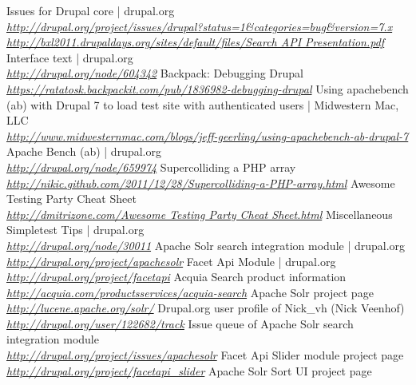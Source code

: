 \begin{thebibliography}{99}
		Issues for Drupal core | drupal.org\\
		\emph{\url{http://drupal.org/project/issues/drupal?status=1&categories=bug&version=7.x}}
		\emph{\url{http://bxl2011.drupaldays.org/sites/default/files/Search API Presentation.pdf}}
		Interface text | drupal.org\\
		\emph{\url{http://drupal.org/node/604342}}
		Backpack: Debugging Drupal\\
		\emph{\url{https://ratatosk.backpackit.com/pub/1836982-debugging-drupal}}
		Using apachebench (ab) with Drupal 7 to load test site with authenticated users | Midwestern Mac, LLC \\
		\emph{\url{http://www.midwesternmac.com/blogs/jeff-geerling/using-apachebench-ab-drupal-7}}
		Apache Bench (ab) | drupal.org\\
		\emph{\url{http://drupal.org/node/659974}}
		Supercolliding a PHP array\\
		\emph{\url{http://nikic.github.com/2011/12/28/Supercolliding-a-PHP-array.html}}
		Awesome Testing Party Cheat Sheet\\
		\emph{\url{http://dmitrizone.com/Awesome Testing Party Cheat Sheet.html}}
		Miscellaneous Simpletest Tips | drupal.org\\
		\emph{\url{http://drupal.org/node/30011}}
		Apache Solr search integration module | drupal.org\\
		\emph{\url{http://drupal.org/project/apachesolr}}
		Facet Api Module |  drupal.org\\
		\emph{\url{http://drupal.org/project/facetapi}}
		Acquia Search product information\\
		\emph{\url{http://acquia.com/productsservices/acquia-search}}
		Apache Solr project page\\
		\emph{\url{http://lucene.apache.org/solr/}}
		Drupal.org user profile of Nick\_vh (Nick Veenhof)\\
		\emph{\url{http://drupal.org/user/122682/track}}
		Issue queue of Apache Solr search integration module\\
		\emph{\url{http://drupal.org/project/issues/apachesolr}}
		Facet Api Slider module project page\\
		\emph{\url{http://drupal.org/project/facetapi_slider}}
		Apache Solr Sort UI project page\\

\end{thebibliography}
